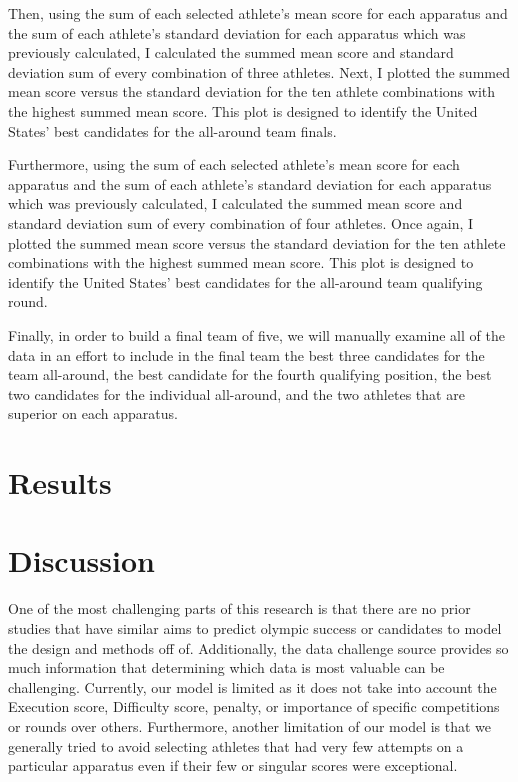 \documentclass[12pt]{article}
\begin{document}
Then, using the sum of each selected athlete's mean score for each apparatus and the sum of each athlete's standard 
deviation for each apparatus which was previously calculated, I calculated the summed mean score and standard deviation sum 
of every combination of three athletes. Next, I plotted the summed mean score versus the standard deviation for the ten 
athlete combinations with the highest summed mean score. This plot is designed to identify the United States' best 
candidates for the all-around team finals.

Furthermore, using the sum of each selected athlete's mean score for each apparatus and the sum of each athlete's standard 
deviation for each apparatus which was previously calculated, I calculated the summed mean score and standard deviation sum 
of every combination of four athletes. Once again, I plotted the summed mean score versus the standard deviation for the ten 
athlete combinations with the highest summed mean score. This plot is designed to identify the United States' best 
candidates for the all-around team qualifying round.

Finally, in order to build a final team of five, we will manually examine all of the data in an effort to include in 
the final team the best three candidates for the team all-around, the best candidate for the fourth qualifying position, 
the best two candidates for the individual all-around, and the two athletes that are superior on each apparatus.


\section{Results}
\label{sec:res}



\section{Discussion}
\label{sec:dis}

One of the most challenging parts of this research is that there are no prior studies that have similar
aims to predict olympic success or candidates to model the design and methods off of. Additionally, 
the data challenge source provides so much information that determining which data is most valuable 
can be challenging. Currently, our model is limited as it does not take into account the 
Execution score, Difficulty score, penalty, or importance of specific competitions or rounds over others. 
Furthermore, another limitation of our model is that we generally tried to avoid selecting athletes that
had very few attempts on a particular apparatus even if their few or singular scores were exceptional.



\end{document}
